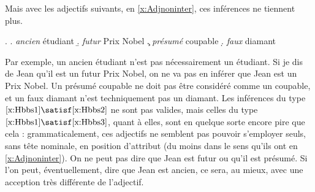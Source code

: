 Mais avec les adjectifs suivants, en \ref{x:Adjnoninter}, ces
inférences ne tiennent plus. 



\ex. \label{x:Adjnoninter}
\a. \emph{ancien} étudiant
\b. %
\emph{futur} Prix Nobel
\c. \emph{présumé} coupable
\d. \emph{faux} diamant

Par exemple, un ancien étudiant n'est pas
nécessairement un étudiant. Si je dis de Jean qu'il est un futur Prix Nobel, on ne va pas en inférer que Jean est un Prix Nobel.  Un présumé coupable ne doit pas être considéré comme un coupable, et un faux diamant n'est techniquement pas un diamant. 
Les inférences du type \(\ref{x:Hbbs1} \satisf \ref{x:Hbbs2}\) ne sont pas valides, mais celles du type \(\ref{x:Hbbs1} \satisf \ref{x:Hbbs3}\), quant à elles, sont en quelque sorte encore pire que cela : grammaticalement, ces adjectifs ne semblent pas pouvoir s'employer seuls, sans tête nominale, en position d'attribut (du moins dans le sens qu'ils ont en \ref{x:Adjnoninter}). On ne peut pas dire que Jean est futur ou qu'il est présumé. Si l'on peut, éventuellement, dire que Jean est ancien, ce sera, au mieux, avec une acception très différente de l'adjectif.

